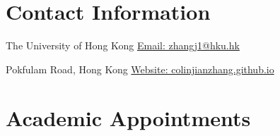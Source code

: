 \documentclass[margin,line]{res}
\newenvironment{list1}{
  \begin{list}{\ding{113}}{%
      \setlength{\itemsep}{0in}
      \setlength{\parsep}{0in} \setlength{\parskip}{0in}
      \setlength{\topsep}{0in} \setlength{\partopsep}{0in} 
      \setlength{\leftmargin}{0.17in}}}{\end{list}}
\begin{document}

\begin{resume}
\thispagestyle{plain} %

\section{\sc Contact Information}
\begin{list1}
	\item[] The University of Hong Kong \hfill \href{mailto: zhangj1@hku.hk}{Email: \color{blue} zhangj1@hku.hk}\\
	\vspace*{-.15in}
	\item[] Pokfulam Road, Hong Kong \hfill \href{https://colinjianzhang.github.io/}{Website: \color{blue} colinjianzhang.github.io}
\end{list1}


\section{\sc Academic Appointments}

\end{resume}
\end{document}
